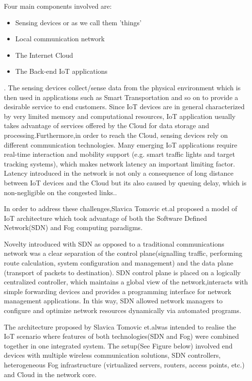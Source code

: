 \documentclass{article}
\begin{document}
Four main components involved are\cite{tomovic2017software}: 
\begin{itemize}
\item Sensing devices or as we call them 'things'
\item Local communication network
\item The Internet Cloud
\item The Back-end IoT applications
\end{itemize}. 
The sensing devices collect/sense data from the physical environment which is then used in applications such as Smart Transportation and so on to provide a desirable service to end customers. 
Since IoT devices are in general characterized by very limited memory and computational resources, IoT application usually takes advantage of services offered by the Cloud for data storage and processing.Furthermore,in order to reach the Cloud, sensing devices rely on different communication technologies\cite{tomovic2017software}. 
Many emerging IoT applications require real-time interaction and mobility support (e.g. smart traffic lights and target tracking systems), which makes network latency an important limiting factor. Latency introduced in the network is not only a consequence of long distance between IoT devices and the Cloud but its also caused by queuing delay, which is non-negligible on the congested links.\cite{tomovic2017software}. 

In order to address these challenges,Slavica Tomovic et.al\cite{tomovic2017software} proposed a model of IoT architecture which took advantage of both the Software Defined Network(SDN) and Fog computing paradigms.
 
Novelty introduced with SDN as opposed to a traditional communications network was a clear separation of the control plane(signalling traffic, performing route
calculation, system configuration and management) and the data plane (transport of packets to destination)\cite{tomovic2017software}. 
SDN control plane is placed on a logically centralized controller, which maintains a global view of the network,interacts with simple forwarding devices and provides a programming interface for network management applications. In this way, SDN allowed network managers to configure and optimize network resources dynamically via automated programs\cite{tomovic2017software}.
 
The architecture proposed by Slavica Tomovic et.al\cite{tomovic2017software}was intended to realise the IoT scenario where features of both technologies(SDN and Fog) were combined together in one integrated system.
The setup(See Figure below)\cite{tomovic2017software} involved end devices with multiple wireless communication solutions, SDN controllers, heterogeneous Fog infrastructure (virtualized servers, routers, access points, etc.) and Cloud in the network core\cite{tomovic2017software}.
\end{document}
